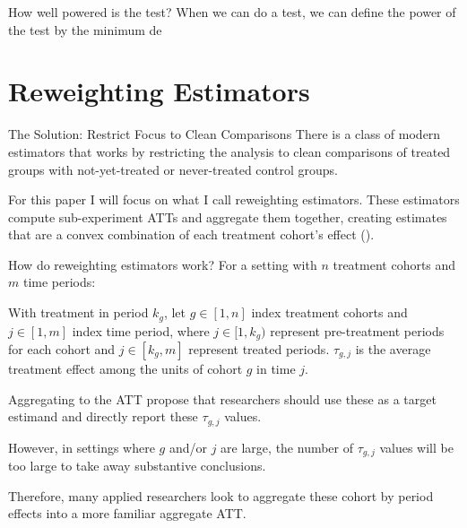 \documentclass[11pt]{beamer}
\begin{document}
\begin{frame}{How well powered is the test?}
    When we can do a test, we can define the power of the test by the minimum de
\end{frame}



\section{Reweighting Estimators}

\begin{frame}{The Solution: Restrict Focus to Clean Comparisons}
    There is a class of modern estimators that works by restricting the analysis to clean comparisons of treated groups with not-yet-treated or never-treated control groups.

    \vspace{2.5mm}

    For this paper I will focus on what I call reweighting estimators. These estimators compute sub-experiment ATTs and aggregate them together, creating estimates that are a convex combination of each treatment cohort's effect (\cite{callaway2021difference, sun2021estimating, baker2026difference}).
\end{frame}


\begin{frame}{How do reweighting estimators work?}
    For a setting with $n$ treatment cohorts and $m$ time periods:
    
    \vspace{2.5mm}

    

    With treatment in period $k_g$, let $g \in [1,n]$ index treatment cohorts and $j \in [1,m]$ index time period, where $j \in [1,k_g)$ represent pre-treatment periods for each cohort and $j \in [k_g,m]$ represent treated periods. $\tau_{g,j}$ is the average treatment effect among the units of cohort $g$ in time $j$.

 

\end{frame}

\begin{frame}{Aggregating to the ATT}    
    \textcite{callaway2021difference} propose that researchers should use these as a target estimand and directly report these $\tau_{g,j}$ values. 

    \vspace{2.5mm}
    
    However, in settings where $g$ and/or $j$ are large, the number of $\tau_{g,j}$ values will be too large to take away substantive conclusions. 
    
\vspace{2.5mm}
    
    Therefore, many applied researchers look to aggregate these cohort by period effects into a more familiar aggregate ATT.
\end{frame}
\end{document}
